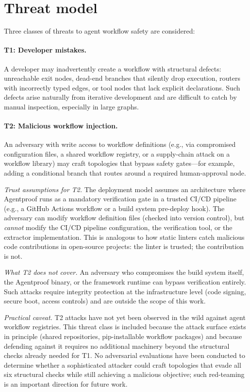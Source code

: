 \section{Threat model}
\label{sec:threat_model}

Three classes of threats to agent workflow safety are considered:

\paragraph{T1: Developer mistakes.}
A developer may inadvertently create a workflow with structural defects:
unreachable exit nodes, dead-end branches that silently drop execution,
routers with incorrectly typed edges, or tool nodes that lack explicit
declarations. Such defects arise naturally from iterative development and
are difficult to catch by manual inspection, especially in large graphs.

\paragraph{T2: Malicious workflow injection.}
An adversary with write access to workflow definitions (e.g., via
compromised configuration files, a shared workflow registry, or a
supply-chain attack on a workflow library) may craft topologies that
bypass safety gates---for example, adding a conditional branch that
routes around a required human-approval node.

\noindent
\emph{Trust assumptions for T2.}
The deployment model assumes an architecture where Agentproof runs as a
mandatory verification gate in a trusted CI/CD pipeline (e.g., a
GitHub Actions workflow or a build system pre-deploy hook).
The adversary can modify workflow definition files (checked into
version control), but \emph{cannot} modify the CI/CD pipeline
configuration, the verification tool, or the extractor
implementation. This is analogous to how static linters catch
malicious code contributions in open-source projects: the linter is
trusted; the contribution is not.

\noindent
\emph{What T2 does not cover.}
An adversary who compromises the build system itself, the Agentproof
binary, or the framework runtime can bypass verification entirely.
Such attacks require integrity protection at the infrastructure level
(code signing, secure boot, access controls) and are outside the scope of this work.

\noindent
\emph{Practical caveat.}
T2 attacks have not yet been observed in the wild against agent workflow
registries. This threat class is included because the attack surface
exists in principle (shared repositories, pip-installable workflow
packages) and because defending against it requires no additional
machinery beyond the structural checks already needed for T1. No
adversarial evaluations have been conducted to determine whether a
sophisticated attacker could craft topologies that evade all six
structural checks while still achieving a malicious objective; such
red-teaming is an important direction for future work.

